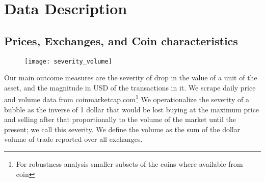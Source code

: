 \section{Data Description}

\subsection{Prices, Exchanges, and Coin characteristics}


\begin{figure}[h]
\texttt{[image: severity\_volume]}
\end{figure}

Our main outcome measures are the severity of drop in the value of a unit of the asset, and the magnitude in USD of the transactions in it.
We scrape daily price and volume data from coinmarketcap.com\footnote{ For robustness analysis smaller subsets of the coins where available from coin }
We operationalize the severity of a bubble as the inverse of 1 dollar that would be lost buying at the maximum price and selling after that proportionally to the volume of the market until the present; we call this severity.
We define the volume as the sum of the dollar volume of trade reported over all exchanges.
